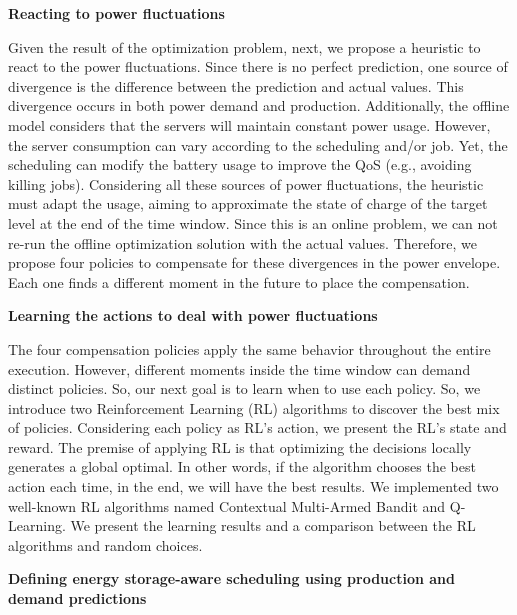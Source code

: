 \begin{center}
    \textbf{Reacting to power fluctuations}
\end{center}
Given the result of the optimization problem, next, we propose a heuristic to react to the power fluctuations. Since there is no perfect prediction, one source of divergence is the difference between the prediction and actual values. This divergence occurs in both power demand and production. Additionally, the offline model considers that the servers will maintain constant power usage. However, the server consumption can vary according to the scheduling and/or job. Yet, the scheduling can modify the battery usage to improve the QoS (e.g., avoiding killing jobs). Considering all these sources of power fluctuations, the heuristic must adapt the usage, aiming to approximate the state of charge of the target level at the end of the time window. Since this is an online problem, we can not re-run the offline optimization solution with the actual values. Therefore, we propose four policies to compensate for these divergences in the power envelope. Each one finds a different moment in the future to place the compensation. 

\begin{center}
    \textbf{Learning the actions to deal with power fluctuations}
\end{center}
The four compensation policies apply the same behavior throughout the entire execution. However, different moments inside the time window can demand distinct policies. So, our next goal is to learn when to use each policy. So, we introduce two Reinforcement Learning (RL) algorithms to discover the best mix of policies. Considering each policy as RL's action, we present the RL's state and reward. The premise of applying RL is that optimizing the decisions locally generates a global optimal. In other words, if the algorithm chooses the best action each time, in the end, we will have the best results. We implemented two well-known RL algorithms named Contextual Multi-Armed Bandit and Q-Learning. We present the learning results and a comparison between the RL algorithms and random choices. 

\begin{center}
    \textbf{Defining energy storage-aware scheduling using production and demand predictions}
\end{center}

